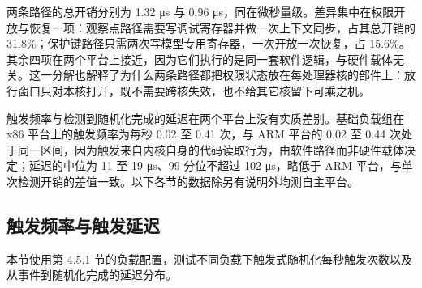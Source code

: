 两条路径的总开销分别为 1.32 μs 与 0.96 μs，同在微秒量级。差异集中在权限开放与恢复一项：观察点路径需要写调试寄存器并做一次上下文同步，占其总开销的 31.8\%；保护键路径只需两次写模型专用寄存器，一次开放一次恢复，占 15.6\%。其余四项在两个平台上接近，因为它们执行的是同一套软件逻辑，与硬件载体无关。这一分解也解释了为什么两条路径都把权限状态放在每处理器核的部件上：放行窗口只对本核打开，既不需要跨核失效，也不给其它核留下可乘之机。

触发频率与检测到随机化完成的延迟在两个平台上没有实质差别。基础负载组在 x86 平台上的触发频率为每秒 0.02 至 0.41 次，与 ARM 平台的 0.02 至 0.44 次处于同一区间，因为触发来自内核自身的代码读取行为，由软件路径而非硬件载体决定；延迟的中位为 11 至 19 μs、99 分位不超过 102 μs，略低于 ARM 平台，与单次检测开销的差值一致。以下各节的数据除另有说明外均测自主平台。

\subsection{触发频率与触发延迟}

本节使用第 4.5.1 节的负载配置，测试不同负载下触发式随机化每秒触发次数以及从事件到随机化完成的延迟分布。


